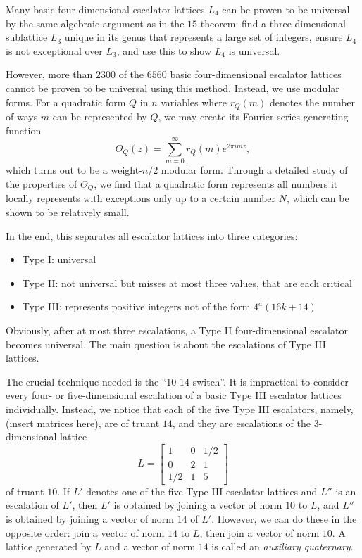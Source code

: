 \documentclass{article}
\begin{document}
Many basic four-dimensional escalator lattices $L_4$ can be proven to be universal by the same algebraic argument as in the $15$-theorem:
find a three-dimensional sublattice $L_3$ unique in its genus that represents a large set of integers, ensure $L_4$ is not exceptional over $L_3$, and use this to show $L_4$ is universal.

However, more than $2300$ of the $6560$ basic four-dimensional escalator lattices cannot be proven to be universal using this method.
Instead, we use modular forms. For a quadratic form $Q$ in $n$ variables where $r_Q(m)$ denotes the number of ways $m$ can be represented by $Q$, we may create its Fourier series generating function
\[\Theta_Q(z) = \sum_{m = 0}^{\infty} r_Q(m) e^{2\pi i m z},\]
which turns out to be a weight-$n/2$ modular form. Through a detailed study of the properties of $\Theta_Q$, we find that a quadratic form represents all numbers it locally represents with exceptions only up to a certain number $N$, which can be shown to be relatively small.

In the end, this separates all escalator lattices into three categories:
\begin{itemize}
    \item Type I: universal
    \item Type II: not universal but misses at most three values, that are each critical
    \item Type III: represents positive integers not of the form $4^a(16k+14)$
\end{itemize}
Obviously, after at most three escalations, a Type II four-dimensional escalator becomes universal.
The main question is about the escalations of Type III lattices.

The crucial technique needed is the ``10-14 switch''.
It is impractical to consider every four- or five-dimensional escalation of a basic Type III escalator lattices individually. Instead, we notice that each of the five Type III escalators, namely, (insert matrices here),
are of truant $14$, and they are escalations of the $3$-dimensional lattice
\[L = \begin{bmatrix} 1 & 0 & 1/2 \\ 0 & 2 & 1 \\ 1/2 & 1 & 5 \end{bmatrix}\]
of truant $10$.
If $L'$ denotes one of the five Type III escalator lattices and $L''$ is an escalation of $L'$, then $L'$ is obtained by joining a vector of norm $10$ to $L$, and $L''$ is obtained by joining a vector of norm $14$ of $L'$.
However, we can do these in the opposite order: join a vector of norm $14$ to $L$, then join a vector of norm $10$.
A lattice generated by $L$ and a vector of norm $14$ is called an \emph{auxiliary quaternary}.
\end{document}
